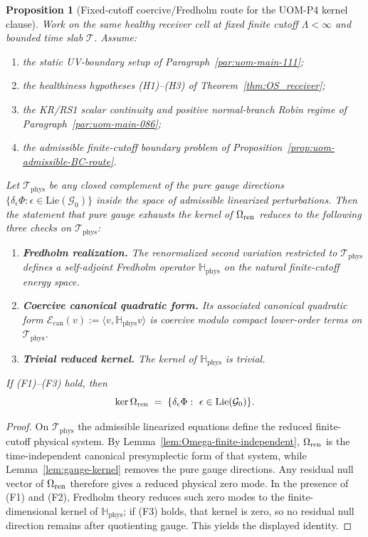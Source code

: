 \documentclass[10pt]{article}
\theoremstyle{definition}
\theoremstyle{plain}
\newtheorem{proposition}{Proposition}[section]
\begin{document}
\begin{proposition}[Fixed-cutoff coercive/Fredholm route for the UOM-P4 kernel clause]
\label{prop:uom-no-extra-deg-route}
Work on the same healthy receiver cell at fixed finite cutoff $\Lambda<\infty$ and bounded time slab $\mathscr T$.
Assume:
\begin{enumerate}[label=\textnormal{(\roman*)},leftmargin=2.2em,itemsep=1pt]
\item the static UV-boundary setup of Paragraph~\ref{par:uom-main-111};
\item the healthiness hypotheses \textnormal{(H1)}--\textnormal{(H3)} of Theorem~\ref{thm:OS_receiver};
\item the KR/RS1 scalar continuity and positive normal-branch Robin regime of Paragraph~\ref{par:uom-main-086};
\item the admissible finite-cutoff boundary problem of Proposition~\ref{prop:uom-admissible-BC-route}.
\end{enumerate}
Let $\mathcal T_{\mathrm{phys}}$ be any closed complement of the pure gauge directions
\(
\{\delta_\epsilon\Phi:\epsilon\in\mathrm{Lie}(\mathcal G_0)\}
\)
inside the space of admissible linearized perturbations.  Then the statement that pure gauge exhausts the kernel of
$\Omega_{\rm ren}$ reduces to the following three checks on $\mathcal T_{\mathrm{phys}}$:
\begin{enumerate}[label=\textnormal{(F\arabic*)},leftmargin=2.4em,itemsep=1pt]
\item \textbf{Fredholm realization.}
The renormalized second variation restricted to $\mathcal T_{\mathrm{phys}}$ defines a self-adjoint Fredholm operator
$\mathbb H_{\mathrm{phys}}$ on the natural finite-cutoff energy space.
\item \textbf{Coercive canonical quadratic form.}
Its associated canonical quadratic form $\mathcal E_{\mathrm{can}}(v):=\langle v,\mathbb H_{\mathrm{phys}}v\rangle$ is coercive modulo compact
lower-order terms on $\mathcal T_{\mathrm{phys}}$.
\item \textbf{Trivial reduced kernel.}
The kernel of $\mathbb H_{\mathrm{phys}}$ is trivial.
\end{enumerate}
If \textnormal{(F1)}--\textnormal{(F3)} hold, then
\[
\ker \Omega_{\rm ren}\;=\;\{\delta_\epsilon\Phi:\ \epsilon\in \mathrm{Lie}(\mathcal G_0)\}.
\]
\end{proposition}

\begin{proof}
On $\mathcal T_{\mathrm{phys}}$ the admissible linearized equations define the reduced finite-cutoff physical system.  By
Lemma~\ref{lem:Omega-finite-independent}, $\Omega_{\rm ren}$ is the time-independent canonical presymplectic form of that system, while
Lemma~\ref{lem:gauge-kernel} removes the pure gauge directions.  Any residual null vector of $\Omega_{\rm ren}$ therefore gives a reduced
physical zero mode.  In the presence of \textnormal{(F1)} and \textnormal{(F2)}, Fredholm theory reduces such zero modes to the finite-dimensional
kernel of $\mathbb H_{\mathrm{phys}}$; if \textnormal{(F3)} holds, that kernel is zero, so no residual null direction remains after quotienting
gauge.  This yields the displayed identity.
\end{proof}
\end{document}
